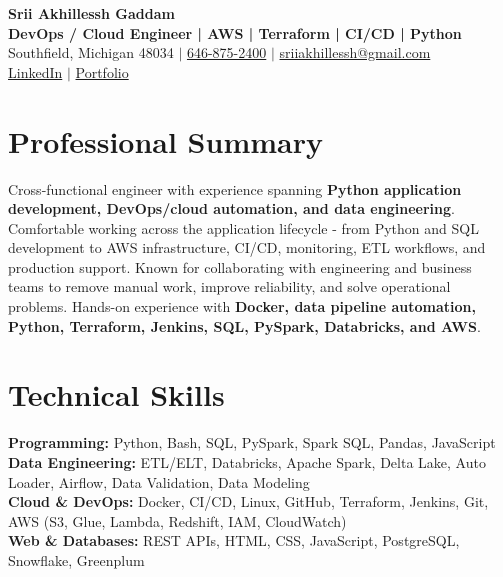 \documentclass[letterpaper,10pt]{article}
\begin{document}
\fontsize{9.35pt}{10.45pt}\selectfont

\begin{center}
    {\LARGE \textbf{Srii Akhillessh Gaddam}} \\[-1pt]
    \textbf{DevOps / Cloud Engineer | AWS | Terraform | CI/CD | Python} \\[2pt]
    Southfield, Michigan 48034 $|$
    \href{tel:6468752400}{646-875-2400} $|$
    \href{mailto:sriiakhillessh@gmail.com}{sriiakhillessh@gmail.com} \\[1pt]
    \href{https://www.linkedin.com/in/srii-akhiilessh-gaddam-b48668191/}{LinkedIn} $|$
    \href{https://sriiakhillesshg.github.io/portfolio/}{Portfolio}
\end{center}
\vspace{-8pt}

\section{Professional Summary}
\small{Cross-functional engineer with experience spanning \textbf{Python application development, DevOps/cloud automation, and data engineering}. Comfortable working across the application lifecycle - from Python and SQL development to AWS infrastructure, CI/CD, monitoring, ETL workflows, and production support. Known for collaborating with engineering and business teams to remove manual work, improve reliability, and solve operational problems. Hands-on experience with \textbf{Docker, data pipeline automation, Python, Terraform, Jenkins, SQL, PySpark, Databricks, and AWS}.}

\section{Technical Skills}
\small{
\textbf{Programming:} Python, Bash, SQL, PySpark, Spark SQL, Pandas, JavaScript \\
\textbf{Data Engineering:} ETL/ELT, Databricks, Apache Spark, Delta Lake, Auto Loader, Airflow, Data Validation, Data Modeling \\
\textbf{Cloud \& DevOps:} Docker, CI/CD, Linux, GitHub, Terraform, Jenkins, Git, AWS (S3, Glue, Lambda, Redshift, IAM, CloudWatch) \\
\textbf{Web \& Databases:} REST APIs, HTML, CSS, JavaScript, PostgreSQL, Snowflake, Greenplum
}
\end{document}

